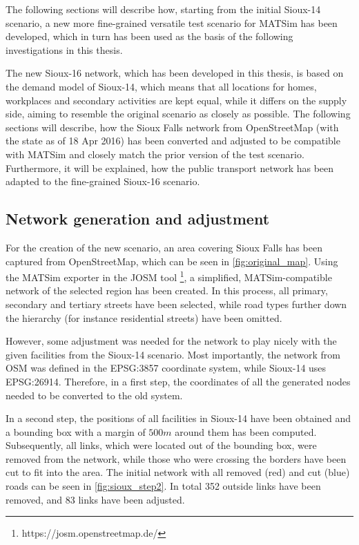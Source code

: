 The following sections will describe how, starting from the initial Sioux-14
scenario, a new more fine-grained versatile test scenario for MATSim has been
developed, which in turn has been used as the basis of the following investigations in this
thesis.

The new Sioux-16 network, which has been developed in this thesis, is based on the
demand model of Sioux-14, which means that all locations for homes, workplaces and
secondary activities are kept equal, while it differs on the supply side, aiming
to resemble the original scenario as closely as possible. The following sections
will describe, how the Sioux Falls network from OpenStreetMap (with the state
as of 18 Apr 2016) has been converted and adjusted to be compatible with MATSim
and closely match the prior version of the test scenario. Furthermore, it will
be explained, how the public transport network has been adapted to the fine-grained
Sioux-16 scenario.

\subsection{Network generation and adjustment}

For the creation of the new scenario, an area covering Sioux Falls has been captured
from OpenStreetMap, which can be seen in \cref{fig:original_map}. Using the MATSim
exporter in the JOSM tool \footnote{https://josm.openstreetmap.de/}, a simplified,
MATSim-compatible network of the selected region has been created. In this process,
all primary, secondary and tertiary streets have been selected, while road types
further down the hierarchy (for instance residential streets) have been omitted.

However, some adjustment was needed for the network to play nicely with
the given facilities from the Sioux-14 scenario. Most importantly, the network from
OSM was defined in the EPSG:3857 coordinate system, while Sioux-14 uses EPSG:26914.
Therefore, in a first step, the coordinates of all the generated nodes needed to
be converted to the old system.

In a second step, the positions of all facilities in Sioux-14 have been obtained
and a bounding box with a margin of $500m$ around them has been computed. Subsequently,
all links, which were located out of the bounding box, were removed from the network,
while those who were crossing the borders have been cut to fit into the area. The
initial network with all removed (red) and cut (blue) roads can be seen in \cref{fig:sioux_step2}.
In total 352 outside links have been removed, and 83 links have been adjusted.

